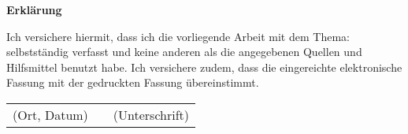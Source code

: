 \clearpage

\thispagestyle{empty}

{\LARGE\textsf{\textbf{Erklärung}}\bigskip}

Ich versichere hiermit, dass ich die vorliegende Arbeit mit dem Thema: \emph{\themaMeinerArbeit} selbstständig verfasst und keine anderen als die angegebenen Quellen und Hilfsmittel benutzt habe.
Ich versichere zudem, dass die eingereichte elektronische Fassung mit der gedruckten Fassung übereinstimmt.

\vspace{3cm}

\begin{center}
  \begin{tabular}{ccc}
    (Ort, Datum) & \hspace{0.3\linewidth} & (Unterschrift)
  \end{tabular}
\end{center}